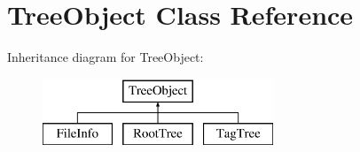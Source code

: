 \hypertarget{classTreeObject}{}\section{Tree\+Object Class Reference}
\label{classTreeObject}
Inheritance diagram for Tree\+Object\+:\begin{figure}[H]
\begin{center}
\leavevmode
\includegraphics[height=2.000000cm]{d9/da2/classTreeObject}
\end{center}
\end{figure}
